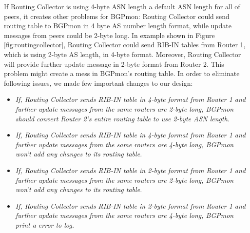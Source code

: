 If Routing Collector is using 4-byte ASN length a default ASN length for all of peers, it creates other problems for BGPmon: Routing Collector could send routing table to BGPmon in 4 byte AS number length format, while update messages from peers could be 2-byte long. In example shown in Figure \ref{fig:routingcollector}, Routing Collector could send RIB-IN tables from Router 1, which is using 2-byte AS length, in 4-byte format. Moreover, Routing Collector will provide further update message in 2-byte format from Router 2. This problem might create a mess in BGPmon's routing table. In order to eliminate following issues, we made few important changes to our design: 
\begin{itemize}
\item{\emph{If, Routing Collector sends RIB-IN table in 4-byte format from Router 1 and further update messages from the same routers are 2-byte long, BGPmon should convert Router 2's entire routing table to use 2-byte ASN length.}} 
\item{\emph{If, Routing Collector sends RIB-IN table in 4-byte format from Router 1 and further update messages from the same routers are 4-byte long, BGPmon won't add any changes to its routing table. }} 
\item{\emph{If, Routing Collector sends RIB-IN table in 2-byte format from Router 1 and further update messages from the same routers are 2-byte long, BGPmon won't add any changes to its routing table.}}
\item{\emph{If, Routing Collector sends RIB-IN table in 2-byte format from Router 1 and further update messages from the same routers are 4-byte long, BGPmon print a error to log.}}
\end{itemize}













